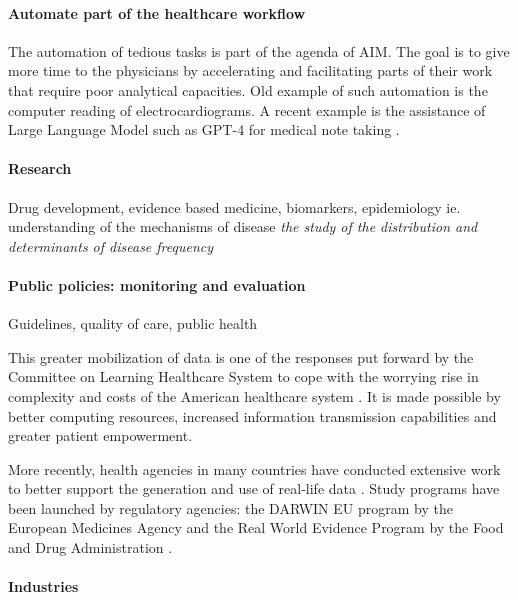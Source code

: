 \documentclass[french,12pt,twoside,a4paper]{book}
\begin{document}
\paragraph{Automate part of the healthcare workflow}

The automation of tedious tasks is part of the agenda of AIM. The goal is to
give more time to the physicians by accelerating and facilitating parts of their
work that require poor analytical capacities. Old example of such automation is
the computer reading of electrocardiograms. A recent example is the assistance
of Large Language Model such as GPT-4 for medical note taking
\citep{lee2023benefits}.

\paragraph{Research}

Drug development, evidence based medicine, biomarkers, epidemiology ie.
understanding of the mechanisms of disease \textit{the study of the distribution
  and determinants of disease frequency} \citep{macmahon1970epidemiology}

\paragraph{Public policies: monitoring and evaluation}

Guidelines, quality of care, public health

This greater mobilization of data is one of the responses put forward by the
Committee on Learning Healthcare System to cope with the worrying rise in
complexity and costs of the American healthcare system \citep{mcginnis2013best}. It is
made possible by better computing resources, increased information transmission
capabilities and greater patient empowerment.

More recently, health agencies in many countries have conducted extensive work
to better support the generation and use of real-life data
\citep{has_real-world_2021,kent_nice_2022,plamondongenevieve_integration_2022,fda_real-world_2021}.
Study programs have been launched by regulatory agencies: the DARWIN EU program
by the European Medicines Agency and the Real World Evidence Program by the Food
and Drug Administration \citep{fda_real_2018}.

\paragraph{Industries}
\end{document}
